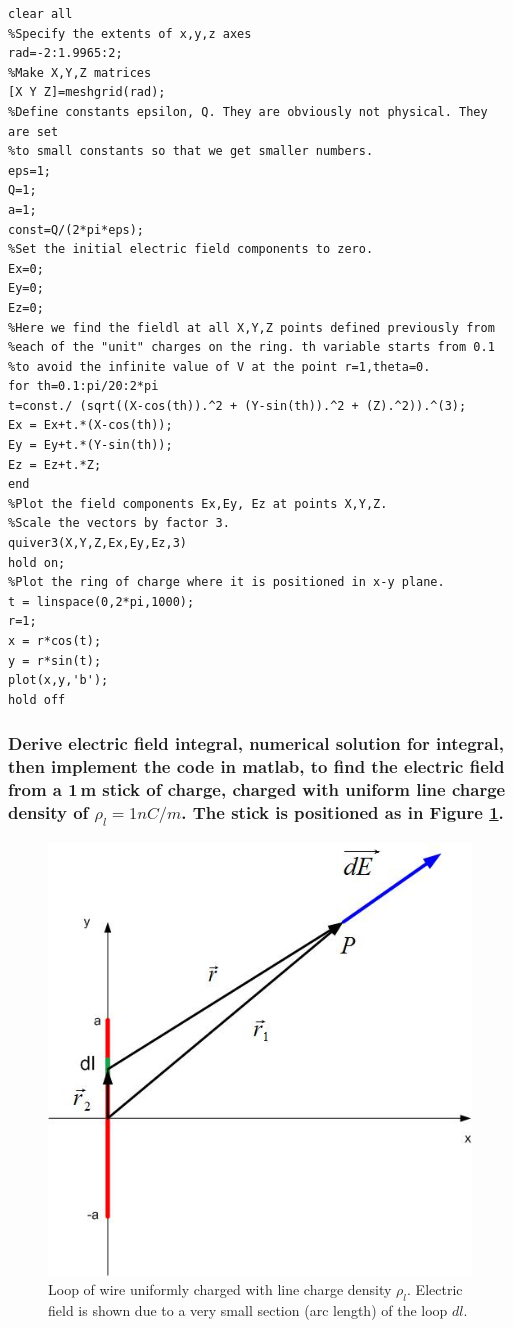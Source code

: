 \documentclass{ximera}
\begin{document}
\begin{verbatim}
clear all
%Specify the extents of x,y,z axes
rad=-2:1.9965:2;
%Make X,Y,Z matrices
[X Y Z]=meshgrid(rad);
%Define constants epsilon, Q. They are obviously not physical. They are set
%to small constants so that we get smaller numbers.
eps=1;
Q=1;
a=1;
const=Q/(2*pi*eps);
%Set the initial electric field components to zero. 
Ex=0;
Ey=0;
Ez=0;
%Here we find the fieldl at all X,Y,Z points defined previously from
%each of the "unit" charges on the ring. th variable starts from 0.1
%to avoid the infinite value of V at the point r=1,theta=0.
for th=0.1:pi/20:2*pi
t=const./ (sqrt((X-cos(th)).^2 + (Y-sin(th)).^2 + (Z).^2)).^(3);
Ex = Ex+t.*(X-cos(th));
Ey = Ey+t.*(Y-sin(th));
Ez = Ez+t.*Z;
end
%Plot the field components Ex,Ey, Ez at points X,Y,Z. 
%Scale the vectors by factor 3.
quiver3(X,Y,Z,Ex,Ey,Ez,3)
hold on;
%Plot the ring of charge where it is positioned in x-y plane.
t = linspace(0,2*pi,1000);
r=1;
x = r*cos(t);
y = r*sin(t);
plot(x,y,'b');
hold off
\end{verbatim}

\subsubsection{Derive  electric field  integral,  numerical solution for integral, then implement the code in matlab, to find the electric field from a 1\,m stick of charge, charged with uniform line charge density of $\rho_l=1nC/m$. The stick is positioned as in Figure \ref{stickf}.}

\begin{figure}[h!]
\begin{center}
\includegraphics[scale=0.5]{../jpg/stickf.jpg}
\caption{\label{stickf} Loop of wire uniformly charged with line charge density $\rho_l$. Electric field is shown due to a very small section (arc length) of the loop $dl$.}
\end{center}
\end{figure}
\end{document}
